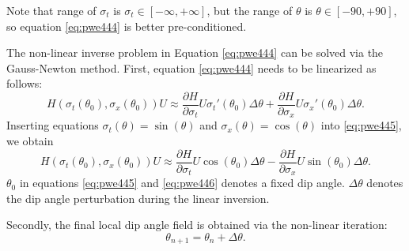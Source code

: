 Note that range of $\sigma_t$ is $\sigma_t\in[-\infty,+\infty]$, but the range of $\theta$ is $\theta\in[-90,+90]$, so equation \ref{eq:pwe444} is better pre-conditioned.

The non-linear inverse problem in Equation \ref{eq:pwe444} can be solved via the Gauss-Newton method. 
First, equation \ref{eq:pwe444} needs to be linearized as follows:
 \begin{equation}
\label{eq:pwe445}
H(\sigma_t(\theta_0),\sigma_x(\theta_0))U \approx \frac{\partial H}{\partial \sigma_t}U\sigma_t'(\theta_0)\Delta \theta + \frac{\partial H}{\partial \sigma_x}U\sigma_x'(\theta_0)\Delta \theta.
\end{equation}
Inserting equations $\sigma_t(\theta)=\sin(\theta)$ and $\sigma_x(\theta)=\cos(\theta)$ into \ref{eq:pwe445}, we obtain
\begin{equation}
\label{eq:pwe446}
H(\sigma_t(\theta_0),\sigma_x(\theta_0))U \approx \frac{\partial H}{\partial \sigma_t}U\cos(\theta_0)\Delta \theta - \frac{\partial H}{\partial \sigma_x}U\sin(\theta_0)\Delta \theta.
\end{equation}
$\theta_0$ in equations \ref{eq:pwe445} and \ref{eq:pwe446} denotes a fixed dip angle. $\Delta \theta$ denotes the dip angle perturbation during the linear inversion. 

Secondly, the final local dip angle field is obtained via the non-linear iteration:
\begin{equation}
\label{eq:niter}
\theta_{n+1} = \theta_{n} + \Delta \theta. 
\end{equation}




